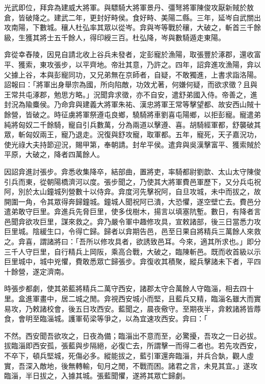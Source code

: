 \begin{pinyinscope}
光武即位，拜弇為建威大將軍。與驃騎大將軍景丹、彊弩將軍陳俊攻厭新賊於敖倉，皆破降之。建武二年，更封好畤侯。食好畤、美陽二縣。三年，延岑自武關出攻南陽，下數城。穰人杜弘率其眾以從岑。弇與岑等戰於穰，大破之，斬首三千餘級，生獲其將士五千餘人，得印綬三百。杜弘降，岑與數騎遁走東陽。

弇從幸舂陵，因見自請北收上谷兵未發者，定彭寵於漁陽，取張豐於涿郡，還收富平、獲索，東攻張步，以平齊地。帝壯其意，乃許之。四年，詔弇進攻漁陽，弇以父據上谷，本與彭寵同功，又兄弟無在京師者，自疑，不敢獨進，上書求詣洛陽。詔報曰：「將軍出身舉宗為國，所向陷敵，功效尤著，何嫌何疑，而欲求徵？且與王常共屯涿郡，勉思方略。」況聞弇求徵，亦不自安，遣舒弟國入侍。帝善之，進封況為隃麋侯。乃命弇與建義大將軍朱祐、漢忠將軍王常等擊望都、故安西山賊十餘營，皆破之。時征虜將軍祭遵屯良鄉，驍騎將車劉喜屯陽鄉，以拒彭寵。寵遣弟純將匈奴二千餘騎，寵自引兵數萬，分為兩道以擊遵、喜。胡騎經軍都，舒襲破其眾，斬匈奴兩王，寵乃退走。況復與舒攻寵，取軍都。五年，寵死，天子嘉況功，使光祿大夫持節迎況，賜甲第，奉朝請。封牟平侯。遣弇與吳漢擊富平、獲索賊於平原，大破之，降者四萬餘人。

因詔弇進討張步。弇悉收集降卒，結部曲，置將吏，率騎都尉劉歆、太山太守陳俊引兵而東，從朝陽橋濟河以度。張步聞之，乃使其大將軍費邑軍歷下，又分兵屯祝阿，別於太山鐘城列營數十以侍弇。弇度河先擊祝阿，自旦攻城，未中而拔之，故開圍一角，令其眾得奔歸鐘城。鐘城人聞祝阿已潰，大恐懼，遂空壁亡去。費邑分遣弟敢守巨里。弇進兵先脅巨里，使多伐樹木，揚言以填塞阬塹。數日，有降者言邑聞弇欲攻巨里，謀來救之。弇乃嚴令軍中趣修攻具，宣敕諸部，後三日當悉力攻巨里城。陰緩生口，令得亡歸。歸者以弇期告邑，邑至日果自將精兵三萬餘人來救之。弇喜，謂諸將曰：「吾所以修攻具者，欲誘致邑耳。今來，適其所求也。」即分三千人守巨里，自行精兵上岡阪，乘高合戰，大破之，臨陳斬邑。既而收首級以示巨里城中，城中兇懼，費敢悉眾亡歸張步。弇復收其積聚，縱兵擊諸未下者，平四十餘營，遂定濟南。

時張步都劇，使其弟藍將精兵二萬守西安，諸郡太守合萬餘人守臨淄，相去四十里。盒進軍畫中，居二城之閒。弇視西安城小而堅，且藍兵又精，臨淄名雖大而實易攻，乃敕諸校會，後五日攻西安。藍聞之，晨夜儆守。至期夜半，弇敕諸將皆蓐食，會明至臨淄城。護軍荀梁等爭之，以為宜速攻西安。弇曰：「

不然。西安聞吾欲攻之，日夜為備；臨淄出不意而至，必驚擾，吾攻之一日必拔。拔臨淄即西安孤，張藍與步隔絕，必復亡去，所謂擊一而得二者也。若先攻西安，不卒下，頓兵堅城，死傷必多。縱能拔之，藍引軍還奔臨淄，并兵合埶，觀人虛實，吾深入敵地，後無轉輸，旬月之閒，不戰而困。諸君之言，未見其宜。」遂攻臨淄，半日拔之，入據其城。張藍聞懼，遂將其眾亡歸劇。


\end{pinyinscope}
